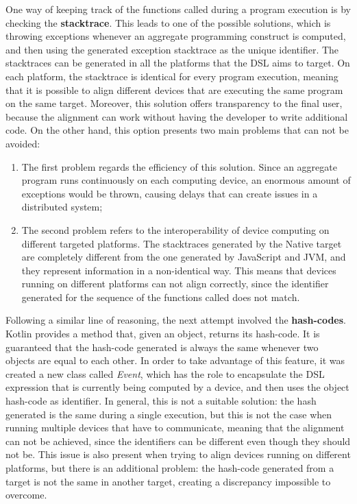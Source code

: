 One way of keeping track of the functions called during a program execution is by checking the \textbf{stacktrace}. This leads to one of the possible solutions, which is throwing exceptions whenever an aggregate programming construct is computed, and then using the generated exception stacktrace as the unique identifier.\newline
The stacktraces can be generated in all the platforms that the DSL aims to target. On each platform, the stacktrace is identical for every program execution, meaning that it is possible to align different devices that are executing the same program on the same target.\newline
Moreover, this solution offers transparency to the final user, because the alignment can work without having the developer to write additional code.\newline
On the other hand, this option presents two main problems that can not be avoided:
\begin{enumerate}
    \item The first problem regards the efficiency of this solution. Since an aggregate program runs continuously on each computing device, an enormous amount of exceptions would be thrown, causing delays that can create issues in a distributed system;
    \item The second problem refers to the interoperability of device computing on different targeted platforms. The stacktraces generated by the Native target are completely different from the one generated by JavaScript and JVM, and they represent information in a non-identical way. This means that devices running on different platforms can not align correctly, since the identifier generated for the sequence of the functions called does not match.
\end{enumerate}

Following a similar line of reasoning, the next attempt involved the \textbf{hash-codes}. Kotlin provides a method that, given an object, returns its hash-code. It is guaranteed that the hash-code generated is always the same whenever two objects are equal to each other. In order to take advantage of this feature, it was created a new class called \textit{Event}, which has the role to encapsulate the DSL expression that is currently being computed by a device, and then uses the object hash-code as identifier.\newline
In general, this is not a suitable solution: the hash generated is the same during a single execution, but this is not the case when running multiple devices that have to communicate, meaning that the alignment can not be achieved, since the identifiers can be different even though they should not be.\newline
This issue is also present when trying to align devices running on different platforms, but there is an additional problem: the hash-code generated from a target is not the same in another target, creating a discrepancy impossible to overcome.

